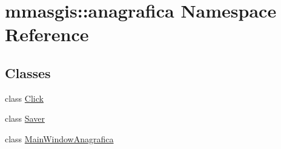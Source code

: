 \hypertarget{namespacemmasgis_1_1anagrafica}{
\section{mmasgis::anagrafica Namespace Reference}
\label{namespacemmasgis_1_1anagrafica}
}
\subsection*{Classes}
\begin{DoxyCompactItemize}
\item 
class \hyperlink{classmmasgis_1_1anagrafica_1_1Click}{Click}
\item 
class \hyperlink{classmmasgis_1_1anagrafica_1_1Saver}{Saver}
\item 
class \hyperlink{classmmasgis_1_1anagrafica_1_1MainWindowAnagrafica}{MainWindowAnagrafica}
\end{DoxyCompactItemize}
